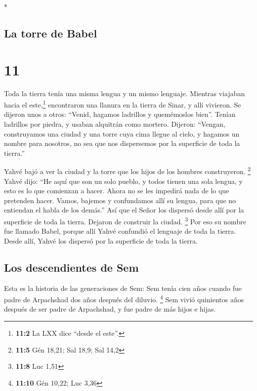 \begin{paracol}{2}
\begin{otherlanguage}{english}
\end{otherlanguage}

\switchcolumn[0]*

\hypertarget{la-torre-de-babel}{%
\subsection{La torre de Babel}\label{la-torre-de-babel}}

\hypertarget{section-20}{%
\section{11}\label{section-20}}

 Toda la tierra tenía una misma lengua y un mismo
lenguaje.  Mientras viajaban hacia el este,\footnote{\textbf{11:2}
  La LXX dice ``desde el este''.} encontraron una llanura en la tierra
de Sinar, y allí vivieron.  Se dijeron unos a otros:
``Venid, hagamos ladrillos y quemémoslos bien''. Tenían ladrillos por
piedra, y usaban alquitrán como mortero.  Dijeron:
``Vengan, construyamos una ciudad y una torre cuya cima llegue al cielo,
y hagamos un nombre para nosotros, no sea que nos dispersemos por la
superficie de toda la tierra.''

 Yahvé bajó a ver la ciudad y la torre que los hijos de
los hombres construyeron. \footnote{\textbf{11:5} Gén 18,21; Sal 18,9;
  Sal 14,2}  Yahvé dijo: ``He aquí que son un solo pueblo,
y todos tienen una sola lengua, y esto es lo que comienzan a hacer.
Ahora no se les impedirá nada de lo que pretenden hacer. 
Vamos, bajemos y confundamos allí su lengua, para que no entiendan el
habla de los demás.''  Así que el Señor los dispersó desde
allí por la superficie de toda la tierra. Dejaron de construir la
ciudad. \footnote{\textbf{11:8} Luc 1,51}  Por eso su
nombre fue llamado Babel, porque allí Yahvé confundió el lenguaje de
toda la tierra. Desde allí, Yahvé los dispersó por la superficie de toda
la tierra.

\hypertarget{los-descendientes-de-sem}{%
\subsection{Los descendientes de Sem}\label{los-descendientes-de-sem}}

 Esta es la historia de las generaciones de Sem: Sem
tenía cien años cuando fue padre de Arpachshad dos años después del
diluvio. \footnote{\textbf{11:10} Gén 10,22; Luc 3,36} 
Sem vivió quinientos años después de ser padre de Arpachshad, y fue
padre de más hijos e hijas.


\end{paracol}
